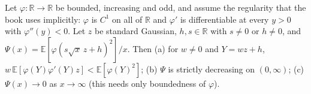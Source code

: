 \begin{theorem}
\label{thm:sg-tal:latala-guerra}
  \leanok
{}
Let $\varphi:\mathbb R\to\mathbb R$ be bounded, increasing and odd, and assume the regularity that the book uses implicitly: $\varphi$ is $C^1$ on all of $\mathbb R$ and $\varphi'$ is
differentiable at every $y>0$ with $\varphi''(y)<0$. Let $z$ be standard Gaussian, $h,s\in\mathbb R$ with $s\ne0$ or $h\ne0$, and $\Psi(x)=\mathbb{E}[\varphi(s\sqrt x\,z+h)^2]/x$.
Then (a) for $w\ne0$ and $Y=wz+h$, $w\,\mathbb{E}[\varphi(Y)\varphi'(Y)z]<\mathbb{E}[\varphi(Y)^2]$; (b) $\Psi$ is strictly decreasing on $(0,\infty)$; (c) $\Psi(x)\to0$ as $x\to\infty$
(this needs only boundedness of $\varphi$).
\end{theorem}
